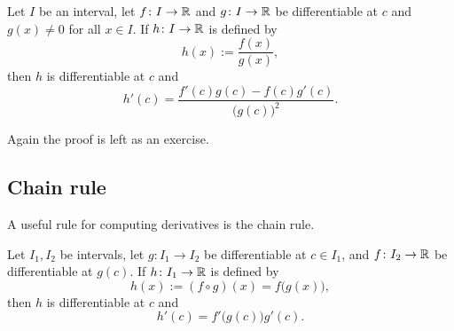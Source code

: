 \begin{prop}
Let $I$ be an interval, let
$f \colon I \to {\mathbb{R}}$ and $g \colon I \to {\mathbb{R}}$ be differentiable at $c$
and $g(x) \not= 0$ for all $x \in I$.
If $h \colon I \to {\mathbb{R}}$
is defined by
\begin{equation*}
h(x) := \frac{f(x)}{g(x)},
\end{equation*}
then $h$ is differentiable at $c$ and
\begin{equation*}
h'(c) = \frac{f'(c) g(c) - f(c) g'(c)}{{\bigl(g(c)\bigr)}^2} .
\end{equation*}
\end{prop}

Again the proof is left as an exercise.

\subsection{Chain rule}

A useful rule for computing derivatives 
is the chain rule.

\begin{prop}
Let $I_1, I_2$ be intervals, let
$g \colon I_1 \to I_2$ be differentiable at $c \in I_1$,
and
$f \colon I_2 \to {\mathbb{R}}$ be differentiable at $g(c)$.
If $h \colon I_1 \to {\mathbb{R}}$
is defined by
\begin{equation*}
h(x) := (f \circ g) (x) = f\bigl(g(x)\bigr) ,
\end{equation*}
then $h$ is differentiable at $c$ and
\begin{equation*}
h'(c) = f'\bigl(g(c)\bigr)g'(c) .
\end{equation*}
\end{prop}

